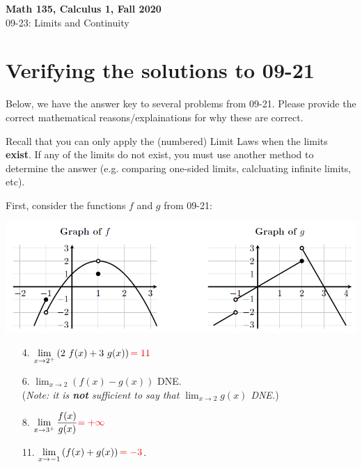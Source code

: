 \documentclass[11pt,reqno,final]{amsart}
\numberwithin{equation}{section}
\numberwithin{figure}{section}
\theoremstyle{definition} %
\newcommand{\dlim}{\displaystyle\lim}
\begin{document}
\onehalfspacing

\begin{center}
        \textbf{\Large Math 135, Calculus 1, Fall 2020}\\[10pt]
        {\large 09-23: Limits and Continuity}
\end{center}

\thispagestyle{empty}

\renewcommand{\thesection}{\Alph{section}}

\section{Verifying the solutions to 09-21}

Below, we have the answer key to several problems from 09-21. Please provide the correct mathematical reasons/explainations for why these are correct.

Recall that you can only apply the (numbered) Limit Laws when the limits \textbf{exist}.
If any of the limits do not exist, you must use another method to determine the answer (e.g. comparing one-sided limits, calcluating infinite limits, etc).

First, consider the functions $f$ and $g$ from 09-21:
\begin{center}
        \includegraphics[width=.8\textwidth]{09-23P_graphs.png}
\end{center}

\begin{enumerate}
\item[4.] $\displaystyle\lim_{x \to 2^+}\left( 2\ f(x) + 3 \ g(x) \right) {\color{red} = 11}$
        \vfill
\item[6.] $\dlim_{x \to 2}\left( f(x) - g(x) \right)$ {\color{red} DNE}.\\
        (\textit{Note: it is \textbf{not} sufficient to say that $\dlim_{x \to 2}g(x)$ DNE.})
        \vfill
\item[8.] $\dlim_{x \to 3^+} \dfrac{f(x)}{g(x)} {\color{red} = +\infty}$
        \vfill
\item[11.] $\dlim_{x \to -1}\left( f(x) + g(x) \right) {\color{red} = -3}$.
        \vfill
\end{enumerate}
\end{document}
